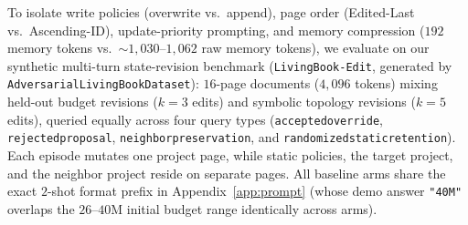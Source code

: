 \documentclass[10pt]{article}
\renewcommand{\_}{\origunderscore\allowbreak}
\begin{document}
To isolate write policies (overwrite vs.\ append), page order (Edited-Last vs.\ Ascending-ID), update-priority prompting, and memory compression ($192$ memory tokens vs.\ $\sim 1{,}030$--$1{,}062$ raw memory tokens), we evaluate on our synthetic multi-turn state-revision benchmark (\texttt{LivingBook-Edit}, generated by \texttt{AdversarialLivingBookDataset}): $16$-page documents ($4{,}096$ tokens) mixing held-out budget revisions ($k=3$ edits) and symbolic topology revisions ($k=5$ edits), queried equally across four query types (\texttt{accepted\_override}, \texttt{rejected\_proposal}, \texttt{neighbor\_preservation}, and \texttt{randomized\_static\_retention}). Each episode mutates one project page, while static policies, the target project, and the neighbor project reside on separate pages. All baseline arms share the exact $2$-shot format prefix in Appendix~\ref{app:prompt} (whose demo answer \texttt{"40M"} overlaps the $26$--$40\text{M}$ initial budget range identically across arms).
\end{document}
